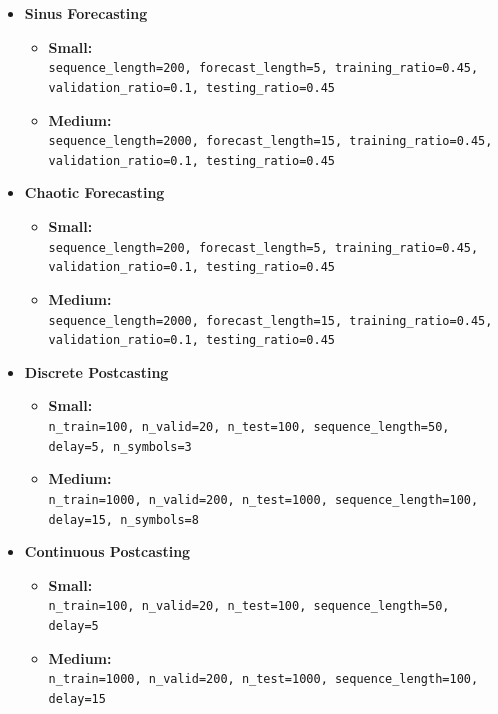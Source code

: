 \documentclass{article}
\begin{document}
\begin{itemize}

    \item \textbf{Sinus Forecasting}
    \begin{itemize}
        \item \textbf{Small:}\\\texttt{sequence\_length=200, forecast\_length=5, training\_ratio=0.45, validation\_ratio=0.1, testing\_ratio=0.45}
        \item \textbf{Medium:}\\ \texttt{sequence\_length=2000, forecast\_length=15, training\_ratio=0.45, validation\_ratio=0.1, testing\_ratio=0.45}
    \end{itemize}

    \item \textbf{Chaotic Forecasting}
    \begin{itemize}
        \item \textbf{Small:}\\ \texttt{sequence\_length=200, forecast\_length=5, training\_ratio=0.45, validation\_ratio=0.1, testing\_ratio=0.45}
        \item \textbf{Medium:}\\ \texttt{sequence\_length=2000, forecast\_length=15, training\_ratio=0.45, validation\_ratio=0.1, testing\_ratio=0.45}
    \end{itemize}

    \item \textbf{Discrete Postcasting}
    \begin{itemize}
        \item \textbf{Small:}\\ \texttt{n\_train=100, n\_valid=20, n\_test=100, sequence\_length=50, delay=5, n\_symbols=3}
        \item \textbf{Medium:}\\ \texttt{n\_train=1000, n\_valid=200, n\_test=1000, sequence\_length=100, delay=15, n\_symbols=8}
    \end{itemize}

    \item \textbf{Continuous Postcasting}
    \begin{itemize}
        \item \textbf{Small:}\\ \texttt{n\_train=100, n\_valid=20, n\_test=100, sequence\_length=50, delay=5}
        \item \textbf{Medium:}\\ \texttt{n\_train=1000, n\_valid=200, n\_test=1000, sequence\_length=100, delay=15}
    \end{itemize}


\end{itemize}
\end{document}
